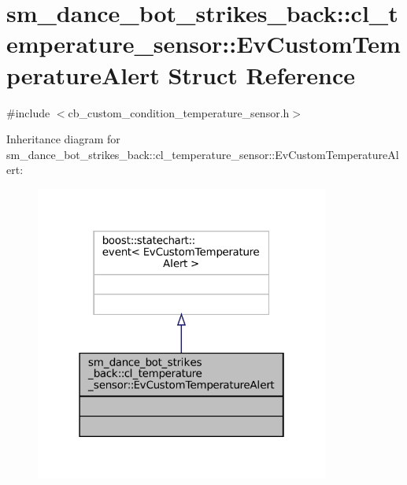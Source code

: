\hypertarget{structsm__dance__bot__strikes__back_1_1cl__temperature__sensor_1_1EvCustomTemperatureAlert}{}\section{sm\+\_\+dance\+\_\+bot\+\_\+strikes\+\_\+back\+:\+:cl\+\_\+temperature\+\_\+sensor\+:\+:Ev\+Custom\+Temperature\+Alert Struct Reference}
\label{structsm__dance__bot__strikes__back_1_1cl__temperature__sensor_1_1EvCustomTemperatureAlert}


{\ttfamily \#include $<$cb\+\_\+custom\+\_\+condition\+\_\+temperature\+\_\+sensor.\+h$>$}



Inheritance diagram for sm\+\_\+dance\+\_\+bot\+\_\+strikes\+\_\+back\+:\+:cl\+\_\+temperature\+\_\+sensor\+:\+:Ev\+Custom\+Temperature\+Alert\+:
\nopagebreak
\begin{figure}[H]
\begin{center}
\leavevmode
\includegraphics[width=274pt]{structsm__dance__bot__strikes__back_1_1cl__temperature__sensor_1_1EvCustomTemperatureAlert__inherit__graph}
\end{center}
\end{figure}


